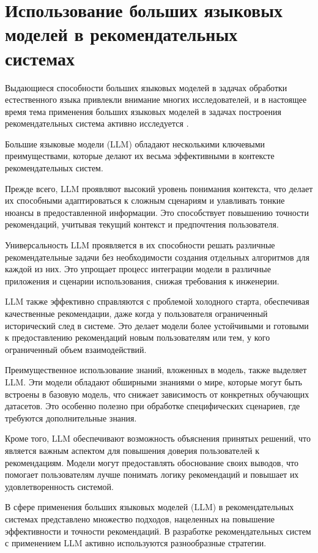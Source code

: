 \section{Использование больших языковых моделей в рекомендательных системах}

Выдающиеся способности больших языковых моделей в задачах обработки естественного языка привлекли внимание многих исследователей, и в настоящее время тема применения больших языковых моделей в задачах построения рекомендательных система активно исследуется \cite{do_llm_undertand_preferences, llm_rs_p5, llm_rs_survey}.

Большие языковые модели (LLM) обладают несколькими ключевыми преимуществами, которые делают их весьма эффективными в контексте рекомендательных систем.

Прежде всего, LLM проявляют высокий уровень понимания контекста, что делает их способными адаптироваться к сложным сценариям и улавливать тонкие нюансы в предоставленной информации. Это способствует повышению точности рекомендаций, учитывая текущий контекст и предпочтения пользователя.

Универсальность LLM проявляется в их способности решать различные рекомендательные задачи без необходимости создания отдельных алгоритмов для каждой из них. Это упрощает процесс интеграции модели в различные приложения и сценарии использования, снижая требования к инженерии.

LLM также эффективно справляются с проблемой холодного старта, обеспечивая качественные рекомендации, даже когда у пользователя ограниченный исторический след в системе. Это делает модели более устойчивыми и готовыми к предоставлению рекомендаций новым пользователям или тем, у кого ограниченный объем взаимодействий.

Преимущественное использование знаний, вложенных в модель, также выделяет LLM. Эти модели обладают обширными знаниями о мире, которые могут быть встроены в базовую модель, что снижает зависимость от конкретных обучающих датасетов. Это особенно полезно при обработке специфических сценариев, где требуются дополнительные знания.

Кроме того, LLM обеспечивают возможность объяснения принятых решений, что является важным аспектом для повышения доверия пользователей к рекомендациям. Модели могут предоставлять обоснование своих выводов, что помогает пользователям лучше понимать логику рекомендаций и повышает их удовлетворенность системой.

В сфере применения больших языковых моделей (LLM) в рекомендательных системах представлено множество подходов, нацеленных на повышение эффективности и точности рекомендаций. В разработке рекомендательных систем с применением LLM активно используются разнообразные стратегии.

